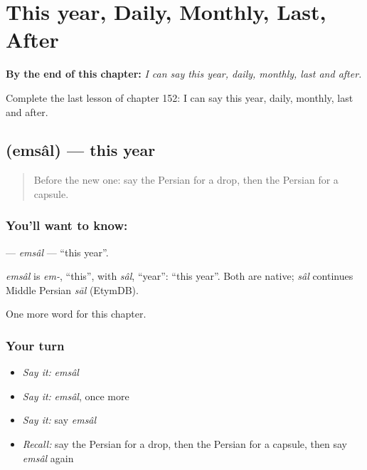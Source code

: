 
\chapter{This year, Daily, Monthly, Last, After}
\label{ch:fa-this-year-daily-monthly-last-after}

\begin{chapteropening}
\textbf{By the end of this chapter:} \emph{I can say this year, daily, monthly, last and after.}

Complete the last lesson of chapter 152: I can say this year, daily, monthly, last and after.
\end{chapteropening}

\section[\texorpdfstring{\fa{امسال} (emsâl)}{امسال (emsâl)}]{ (emsâl) — this year}

\label{lesson:FA-C152-emsal}



\begin{quote}
Before the new one: say the Persian for a drop, then the Persian for a capsule.
\end{quote}

\subsection*{You'll want to know: }
\textbf{} — \emph{emsâl} — \textquotedblleft{}this year\textquotedblright{}.

\begin{cousinweb}
\emph{emsâl} is \emph{em-}, \textquotedblleft{}this\textquotedblright{}, with \emph{sâl}, \textquotedblleft{}year\textquotedblright{}: \textquotedblleft{}this year\textquotedblright{}. Both are native; \emph{sâl} continues Middle Persian \emph{sāl} (EtymDB).
\end{cousinweb}

\begin{grammarlens}[title={What you've built}]
One more word for this chapter.
\end{grammarlens}

\subsection*{Your turn}
\begin{itemize}
\raggedright
  \item \emph{Say it:} \emph{emsâl}
  \item \emph{Say it:} \emph{emsâl}, once more
  \item \emph{Say it:} say \emph{emsâl}
  \item \emph{Recall:} say the Persian for a drop, then the Persian for a capsule, then say \emph{emsâl} again
\end{itemize}

